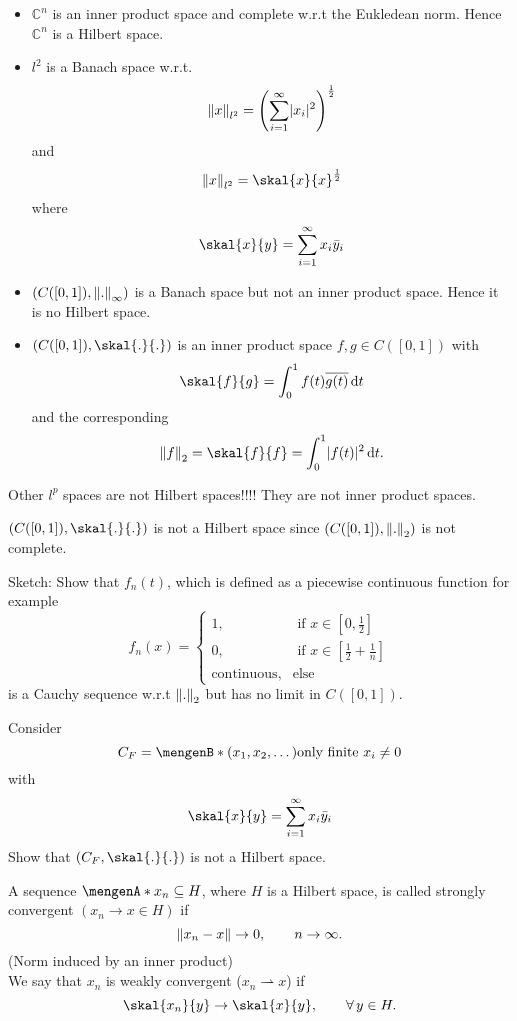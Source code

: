\begin{beispiele}
	\begin{itemize}
		\item $\mathbb{C}^n$ is an inner product space and complete w.r.t the Eukledean norm. Hence $\mathbb{C}^n$ is a Hilbert space.
		\item $l^2$ is a Banach space w.r.t. 
		\[
			\norm{x}_{l^2} = \left( \sum_{i=1}^{\infty} \abs{x_i}^2 \right)^{\frac{1}{2}}
		\]
		and
		\[
			\norm{x}_{l^2} = \skal{x}{x}^{\frac{1}{2}}
		\]
		where
		\[
			\skal{x}{y} = \sum_{i=1}^{\infty} x_i \bar{y}_i
		\]
		\item $(C([0,1]), \norm{.}_{\infty})$ is a Banach space but not an inner product space. Hence it is no Hilbert space.
		\item $(C([0,1]),\skal{.}{.})$ is an inner product space $f,g \in C([0,1])$ with
		\[
			\skal{f}{g} = \int_{0}^{1} f(t) \overline{g(t)} \,\mathrm{d}t
		\]
		and the corresponding
		\[
			\norm{f}_2 = \skal{f}{f} = \int_{0}^{1} \abs{f(t)}^2 \,\mathrm{d}t.
		\]
	\end{itemize}
\end{beispiele}
\begin{bemerkung}
	Other $l^p$ spaces are not Hilbert spaces!!!! They are not inner product spaces.
\end{bemerkung}

\begin{satz}
	$(C([0,1]), \skal{.}{.})$ is not a Hilbert space since $(C([0,1]), \norm{.}_2)$ is not complete.
\end{satz}

\begin{beweis}
	Sketch: Show that $f_n(t)$, which is defined as a piecewise continuous function for example
	\[
		f_n(x)= \begin{cases}
			1, &\text{ if }x \in [0,\frac{1}{2}]\\
			0, &\text{ if }x \in [\frac{1}{2} + \frac{1}{n}] \\
			\text{continuous}, & \text{else} 
		\end{cases}
	\] is a Cauchy sequence w.r.t $\norm{.}_2$ but has no limit in $C([0,1])$.
\end{beweis}

Consider
\[
	C_F = \set[(x_1,x_2,\dots)]{\text{only finite }x_i \neq 0} 
\]
with \[
	\skal{x}{y} = \sum_{i=1}^{\infty} x_i \bar{y}_i
\]
Show that $(C_F, \skal{.}{.})$ is not a Hilbert space.

\begin{definition}
	A sequence $\set{x_n} \subseteq H$, where $H$ is a Hilbert space, is called strongly convergent $(x_n \to x \in H)$ if 
	\[
		\norm{x_n -x} \to 0, \qquad n \to  \infty.
	\]
	(Norm induced by an inner product) \\ We say that $x_n$ is weakly convergent ($x_n \rightharpoonup x$) if
	\[
		\skal{x_n}{y} \to \skal{x}{y}, \qquad \forall\, y \in H.
	\]
\end{definition}

